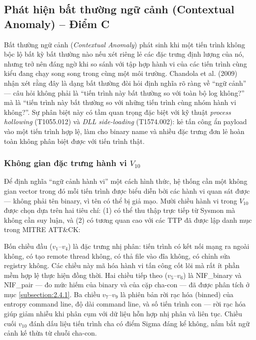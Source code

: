 \documentclass[../main.tex]{subfiles}
\begin{document}
\subsection{Phát hiện bất thường ngữ cảnh (Contextual Anomaly) – Điểm C}
\label{subsection:2.4.3}

Bất thường ngữ cảnh (\textit{Contextual Anomaly}) phát sinh khi một tiến trình không bộc lộ bất kỳ bất thường nào nếu xét riêng lẻ các đặc trưng định lượng của nó, nhưng trở nên đáng ngờ khi so sánh với tập hợp hành vi của các tiến trình cùng kiểu đang chạy song song trong cùng một môi trường. Chandola et al. (2009) nhận xét rằng đây là dạng bất thường đòi hỏi định nghĩa rõ ràng về ``ngữ cảnh'' — câu hỏi không phải là ``tiến trình này bất thường so với toàn bộ log không?'' mà là ``tiến trình này bất thường so với những tiến trình cùng nhóm hành vi không?''. Sự phân biệt này có tầm quan trọng đặc biệt với kỹ thuật \textit{process hollowing} (T1055.012) và \textit{DLL side-loading} (T1574.002): kẻ tấn công ẩn payload vào một tiến trình hợp lệ, làm cho binary name và nhiều đặc trưng đơn lẻ hoàn toàn không phân biệt được với tiến trình thật.

\subsubsection{Không gian đặc trưng hành vi $V_{10}$}
\label{subsubsection:2.4.3.1}

Để định nghĩa ``ngữ cảnh hành vi'' một cách hình thức, hệ thống cần một không gian vector trong đó mỗi tiến trình được biểu diễn bởi các hành vi quan sát được — không phải tên binary, vì tên có thể bị giả mạo. Mười chiều hành vi trong $V_{10}$ được chọn dựa trên hai tiêu chí: (1) có thể thu thập trực tiếp từ Sysmon mà không cần suy luận, và (2) có tương quan cao với các TTP đã được lập danh mục trong MITRE ATT\&CK:

Bốn chiều đầu ($v_1$–$v_4$) là đặc trưng nhị phân: tiến trình có kết nối mạng ra ngoài không, có tạo remote thread không, có thả file vào đĩa không, có chỉnh sửa registry không. Các chiều này mã hóa hành vi tấn công cốt lõi mà rất ít phần mềm hợp lệ thực hiện đồng thời. Hai chiều tiếp theo ($v_5$–$v_6$) là NIF\_binary và NIF\_pair — đo mức hiếm của binary và của cặp cha-con — đã được phân tích ở mục \ref{subsection:2.4.1}. Ba chiều $v_7$–$v_9$ là phiên bản rời rạc hóa (binned) của entropy command line, độ dài command line, và số tiến trình con — rời rạc hóa giúp giảm nhiễu khi phân cụm với dữ liệu hỗn hợp nhị phân và liên tục. Chiều cuối $v_{10}$ đánh dấu liệu tiến trình cha có điểm Sigma đáng kể không, nắm bắt ngữ cảnh kế thừa từ chuỗi cha-con.
\end{document}
